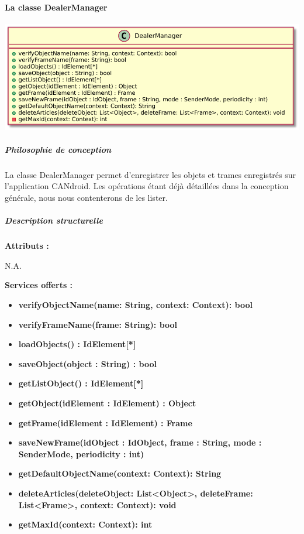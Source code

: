 \paragraph{La classe DealerManager}


\begin{minipage}
    {\linewidth}
    \centering
    \includegraphics[width=0.80\linewidth]{../schemas/Conception_detaillee/classe_dealer.pdf}
\end{minipage}
\subparagraph{Philosophie de conception \newline} 

\medspace

La classe DealerManager permet d'enregistrer les objets et trames enregistrés sur l'application CANdroid. Les opérations étant déjà détaillées dans la conception générale, nous nous contenterons de les lister.
\subparagraph{Description structurelle \newline}

\medspace

\textbf{Attributs :}

N.A.

\textbf{Services offerts :}

\begin{itemize}
    \item \textbf{verifyObjectName(name: String, context: Context): bool}  
    \item \textbf{verifyFrameName(frame: String): bool}
    \item \textbf{loadObjects() : IdElement[*]}  
    \item \textbf{saveObject(object : String) : bool}  
    \item \textbf{getListObject() : IdElement[*]}  
    \item \textbf{getObject(idElement : IdElement) : Object}  
    \item \textbf{getFrame(idElement : IdElement) : Frame}  
    \item \textbf{saveNewFrame(idObject : IdObject, frame : String, mode : SenderMode, periodicity : int)}  
    \item \textbf{getDefaultObjectName(context: Context): String}
    \item \textbf{deleteArticles(deleteObject: List<Object>, deleteFrame: List<Frame>, context: Context): void} 
    \item \textbf{getMaxId(context: Context): int}
\end{itemize}

